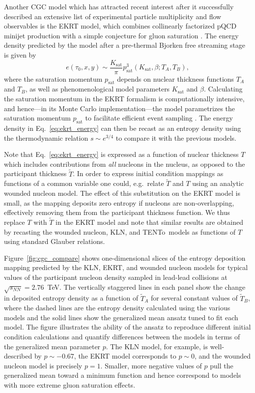 \documentclass[aps,prc,reprint,amsmath,nofootinbib]{revtex4-1}
\newcommand{\trento}{T\raisebox{-0.5ex}{R}ENTo}
\newcommand{\sqrts}{\sqrt{s_{NN}}}
\newcommand{\T}{\tilde{T}}
\begin{document}
Another CGC model which has attracted recent interest after it successfully described an extensive list of experimental particle multiplicity and flow observables \cite{Niemi:2015qia, Paatelainen:2013eea} is the EKRT model, which combines collinearly factorized pQCD minijet production with a simple conjecture for gluon saturation \cite{Eskola:1999fc, Eskola:2001bf}.
The energy density predicted by the model after a pre-thermal Bjorken free streaming stage is given by
\begin{equation}
  e(\tau_0, x, y) \sim \frac{K_\text{sat}}{\pi} p_\text{sat}^3(K_\text{sat}, \beta; T_A, T_B),
  \label{eq:ekrt_energy}
\end{equation}
where the saturation momentum $p_\text{sat}$ depends on nuclear thickness functions $T_A$ and $T_B$, as well as phenomenological model parameters $K_\text{sat}$ and $\beta$.
Calculating the saturation momentum in the EKRT formalism is computationally intensive, and hence---in its Monte Carlo implementation---the model parametrizes the saturation momentum $p_\text{sat}$ to facilitate efficient event sampling \cite{Niemi:2015qia}.
The energy density in Eq.~\eqref{eq:ekrt_energy} can then be recast as an entropy density using the thermodynamic relation ${s \sim e^{3/4}}$ to compare it with the previous models.

Note that Eq.~\eqref{eq:ekrt_energy} is expressed as a function of nuclear thickness $T$ which includes contributions from \emph{all} nucleons in the nucleus, as opposed to the participant thickness $\T$.
In order to express initial condition mappings as functions of a common variable one could, e.g.\ relate $\T$ and $T$ using an analytic wounded nucleon model.
The effect of this substitution on the EKRT model is small, as the mapping deposits zero entropy if nucleons are non-overlapping, effectively removing them from the participant thickness function.
We thus replace $T$ with $\T$ in the EKRT model and note that similar results are obtained by recasting the wounded nucleon, KLN, and \trento\ models as functions of $T$ using standard Glauber relations.

Figure~\ref{fig:cgc_compare} shows one-dimensional slices of the entropy deposition mapping predicted by the KLN, EKRT, and wounded nucleon models for typical values of the participant nucleon density sampled in lead-lead collisions at $\sqrts=2.76$~TeV.
The vertically staggered lines in each panel show the change in deposited entropy density as a function of $\T_A$ for several constant values of $\T_B$, where the dashed lines are the entropy density calculated using the various models and the solid lines show the generalized mean ansatz tuned to fit each model.
The figure illustrates the ability of the ansatz to reproduce different initial condition calculations and quantify differences between the models in terms of the generalized mean parameter $p$.
The KLN model, for example, is well-described by $p\sim-0.67$, the EKRT model corresponds to $p \sim 0$, and the wounded nucleon model is precisely $p=1$.
Smaller, more negative values of $p$ pull the generalized mean toward a minimum function and hence correspond to models with more extreme gluon saturation effects.
\end{document}
